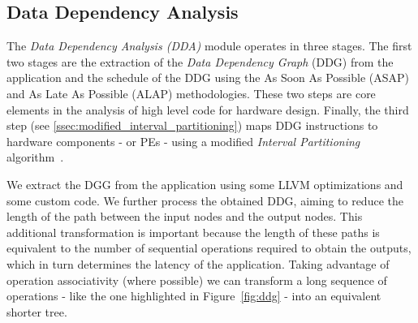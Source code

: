 \vspace{-1mm}
\subsection{Data Dependency Analysis}
\label{ssec:dda}
\vspace{-1mm}
The \textit{Data Dependency Analysis (DDA)} module operates in three stages. The first two stages are the extraction of the \textit{Data Dependency Graph} (DDG)\cite{isoda1983global} from the application and the schedule of the DDG using the As Soon As Possible (ASAP) and As Late As Possible (ALAP) methodologies. These two steps are core elements in the analysis of high level code for hardware design\cite{hwang1991formal}. Finally, the third step (see \ref{ssec:modified_interval_partitioning}) maps DDG instructions to hardware components - or PEs - using a modified \textit{Interval Partitioning} algorithm~\cite{greedyIntervalPartitioning}.


We extract the DGG from the application using some LLVM optimizations and some custom code. We further process the obtained DDG, aiming to reduce the length of the path between the input nodes and the output nodes. This additional transformation is important because the length of these paths is equivalent to the number of sequential operations required to obtain the outputs, which in turn determines the latency of the application. Taking advantage of operation associativity (where possible) we can transform a long sequence of operations - like the one highlighted in Figure~\ref{fig:ddg} - into an equivalent shorter tree.

